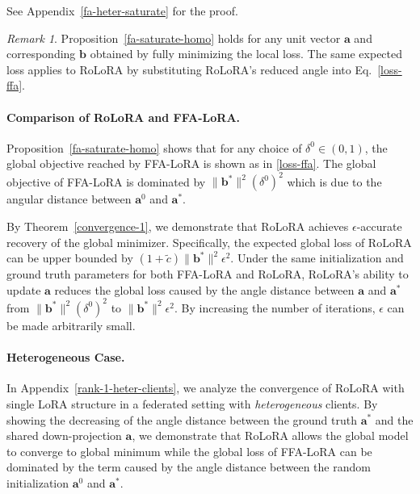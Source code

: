 \documentclass{article}
\theoremstyle{plain}
\theoremstyle{definition}
\theoremstyle{remark}
\newtheorem{remark}[theorem]{Remark}
\begin{document}
See Appendix~\ref{fa-heter-saturate} for the proof. 
\begin{remark}
    Proposition~\ref{fa-saturate-homo} holds for any unit vector $\mathbf{a}$ and corresponding $\mathbf{b}$ obtained by fully minimizing the local loss. The same expected loss applies to RoLoRA by substituting RoLoRA's reduced angle into Eq.~\ref{loss-ffa}.
\end{remark}
\vspace{-0.2cm}
\paragraph{Comparison of RoLoRA and FFA-LoRA.} Proposition~\ref{fa-saturate-homo} shows that for any choice of $\delta^0 \in (0,1)$, the global objective reached by FFA-LoRA is shown as in \eqref{loss-ffa}. The global objective of FFA-LoRA is dominated by $\|\mathbf b^*\|^2 (\delta^0)^2$  which is due to the angular distance between $\mathbf{a}^0$ and $\mathbf{a}^*$. 

By Theorem~\ref{convergence-1}, we demonstrate that RoLoRA achieves $\epsilon$-accurate recovery of the global minimizer. Specifically, the expected global loss of RoLoRA can be upper bounded by $(1+\tilde{c})\| \mathbf{b}^*\|^2\epsilon^2$. Under the same initialization and ground truth parameters for both FFA-LoRA and RoLoRA, RoLoRA's ability to update $\mathbf{a}$ reduces the global loss caused by the angle distance between $\mathbf{a}$ and $\mathbf{a}^*$ from $\| \mathbf{b}^*\|^2(\delta^0)^2$ to $\| \mathbf{b}^*\|^2\epsilon^2$. By increasing the number of iterations, $\epsilon$ can be made arbitrarily small. 

\paragraph{Heterogeneous Case.} In Appendix~\ref{rank-1-heter-clients}, we analyze the convergence of RoLoRA with single LoRA structure in a federated setting with \textit{heterogeneous} clients. By showing the decreasing of the angle distance between the ground truth $\mathbf{a}^*$ and the shared down-projection $\mathbf{a}$, we demonstrate that RoLoRA allows the global model to converge to global minimum while the global loss of FFA-LoRA can be dominated by the term caused by the angle distance between the random initialization $\mathbf{a}^0$ and $\mathbf{a}^*$.
\vspace{-0.3cm}
\end{document}
